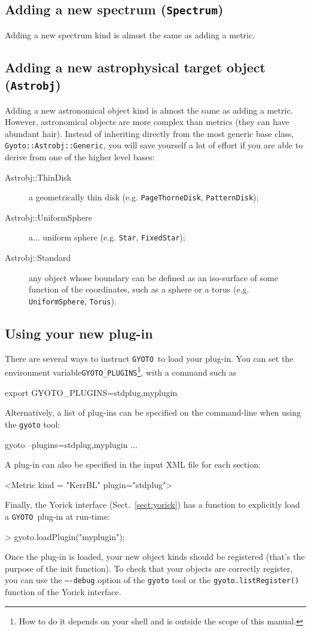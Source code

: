 \documentclass[a4paper,12pt]{article}
\newcommand{\GYOTO}{\texttt{GYOTO}}
\newcommand{\Astrobj}{\texttt{Astrobj}}
\newcommand{\Spectrum}{\texttt{Spectrum}}
\begin{document}
\subsection{Adding a new spectrum (\Spectrum)}

Adding a new spectrum kind is almost the same as adding a metric.

\subsection{Adding a new astrophysical target object (\Astrobj)}
\label{newastrobj}

Adding a new astronomical object kind is almost the same as adding a
metric. However, astronomical objects are more complex than metrics
(they can have abundant hair). Instead of inheriting directly from the
most generic base class, \texttt{Gyoto::Astrobj::Generic}, you will
save yourself a lot of effort if you are able to derive from one of
the higher level bases:
\begin{description}
\item[Astrobj::ThinDisk] a geometrically thin disk
  (e.g. \texttt{PageThorneDisk}, \texttt{PatternDisk});
\item[Astrobj::UniformSphere] a... uniform sphere (e.g. \texttt{Star},
  \texttt{FixedStar});
\item[Astrobj::Standard] any object whose boundary can be defined as
  an iso-surface of some function of the coordinates, such as a sphere
  or a torus (e.g. \texttt{UniformSphere}, \texttt{Torus}).
\end{description}

\subsection{Using your new plug-in}
There are several ways to instruct \GYOTO\ to load your plug-in. You
can set the environment variable\texttt{GYOTO\_PLUGINS}\footnote{How
  to do it depends on your shell and is outside the scope of this
  manual.}, with a command such as
\begin{code}
  export GYOTO_PLUGINS=stdplug,myplugin
\end{code}
Alternatively, a list of plug-ins can be specified on the command-line
when using the \texttt{gyoto} tool:
\begin{code}
  gyoto --plugins=stdplug,myplugin ...
\end{code}
A plug-in can also be specified in the input XML file for each
section:
\begin{code}
   <Metric kind = "KerrBL" plugin="stdplug">
\end{code}
Finally, the Yorick interface (Sect.~\ref{sect:yorick}) has a function
to explicitly load a \GYOTO\ plug-in at run-time:
\begin{code}
 > gyoto.loadPlugin("myplugin");
\end{code}
Once the plug-in is loaded, your new object kinds should be registered
(that's the purpose of the init function). To check that your objects
are correctly register, you can use the \texttt{----debug} option of
the \texttt{gyoto} tool or the \texttt{gyoto.listRegister()} function
of the Yorick interface.
\end{document}
